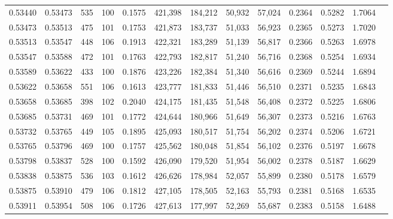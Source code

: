 \begin{tabular}{rrrrrrrrrrrrr}
0.53440 & 0.53473 &   535 & 100 &                                     0.1575 & 421,398 & 184,212 &  50,932 &  57,024 & 0.2364 & 0.5282 & 1.7064 \\
0.53473 & 0.53513 &   475 & 101 &                                     0.1753 & 421,873 & 183,737 &  51,033 &  56,923 & 0.2365 & 0.5273 & 1.7020 \\
0.53513 & 0.53547 &   448 & 106 &                                     0.1913 & 422,321 & 183,289 &  51,139 &  56,817 & 0.2366 & 0.5263 & 1.6978 \\
0.53547 & 0.53588 &   472 & 101 &                                     0.1763 & 422,793 & 182,817 &  51,240 &  56,716 & 0.2368 & 0.5254 & 1.6934 \\
0.53589 & 0.53622 &   433 & 100 &                                     0.1876 & 423,226 & 182,384 &  51,340 &  56,616 & 0.2369 & 0.5244 & 1.6894 \\
0.53622 & 0.53658 &   551 & 106 &                                     0.1613 & 423,777 & 181,833 &  51,446 &  56,510 & 0.2371 & 0.5235 & 1.6843 \\
0.53658 & 0.53685 &   398 & 102 &                                     0.2040 & 424,175 & 181,435 &  51,548 &  56,408 & 0.2372 & 0.5225 & 1.6806 \\
0.53685 & 0.53731 &   469 & 101 &                                     0.1772 & 424,644 & 180,966 &  51,649 &  56,307 & 0.2373 & 0.5216 & 1.6763 \\
0.53732 & 0.53765 &   449 & 105 &                                     0.1895 & 425,093 & 180,517 &  51,754 &  56,202 & 0.2374 & 0.5206 & 1.6721 \\
0.53765 & 0.53796 &   469 & 100 &                                     0.1757 & 425,562 & 180,048 &  51,854 &  56,102 & 0.2376 & 0.5197 & 1.6678 \\
0.53798 & 0.53837 &   528 & 100 &                                     0.1592 & 426,090 & 179,520 &  51,954 &  56,002 & 0.2378 & 0.5187 & 1.6629 \\
0.53838 & 0.53875 &   536 & 103 &                                     0.1612 & 426,626 & 178,984 &  52,057 &  55,899 & 0.2380 & 0.5178 & 1.6579 \\
0.53875 & 0.53910 &   479 & 106 &                                     0.1812 & 427,105 & 178,505 &  52,163 &  55,793 & 0.2381 & 0.5168 & 1.6535 \\
0.53911 & 0.53954 &   508 & 106 &                                     0.1726 & 427,613 & 177,997 &  52,269 &  55,687 & 0.2383 & 0.5158 & 1.6488 \\

\end{tabular}
